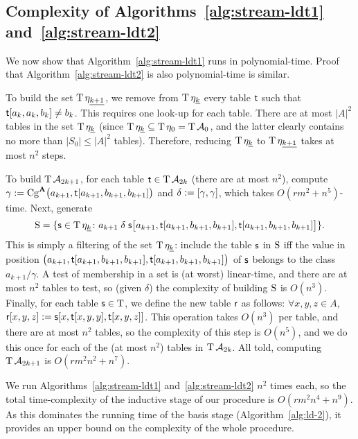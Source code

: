   \subsection{Complexity of Algorithms~\ref{alg:stream-ldt1} and~\ref{alg:stream-ldt2}}
  We now show that Algorithm~\ref{alg:stream-ldt1} runs in polynomial-time.
  Proof that Algorithm~\ref{alg:stream-ldt2} is also polynomial-time is similar.

  To build the set $\operatorname{T} \eta_{\underline{k+1}}$, we remove
  from $\operatorname{T} \eta_{\underline{k}}$ every table $\mathsf{t}$ such that $\mathsf{t}[a_k,a_k,b_k]\neq b_k$.
  This requires one look-up for each table.  There are
  at most $|A|^2$ tables in the set $\operatorname{T} \eta_{\underline{k}}$
  (since $\operatorname{T} \eta_{\underline{k}} \subseteq \operatorname{T} \eta_0 = \operatorname{T} \mathcal{A}_0$, and
  the latter clearly contains no more than $|S_0| \leq |A|^2$ tables).
  Therefore, reducing $\operatorname{T} \eta_{\underline{k}}$ to $\operatorname{T} \eta_{\underline{k+1}}$ takes at most $n^2$ steps.

  To build $\operatorname{T} \mathcal{A}_{2k+1}$,
  for each table $\mathsf{t} \in \operatorname{T} \mathcal{A}_{2k}$ (there are at most $n^2$),
  compute $\gamma := \operatorname{Cg}^{\mathbf{A}}\bigl(a_{k+1}, \mathsf{t}[a_{k+1}, b_{k+1}, b_{k+1}]\bigr)$ and
  $\delta := [\gamma, \gamma]$, which takes
  $O(rm^2 + n^5)$-time.  Next, generate
  \[
    \operatorname{S} = \{\mathsf{s} \in \operatorname{T} \eta_{\underline{k}} \colon  a_{k+1} \mathrel{\delta}
    \mathsf{s} \bigl[a_{k+1},  \mathsf{t}[a_{k+1}, b_{k+1}, b_{k+1}],  \mathsf{t}[a_{k+1}, b_{k+1}, b_{k+1}]\bigr]\}.
  \]
  This is simply a filtering of the set $\operatorname{T} \eta_{\underline{k}}$:
  include the table $\mathsf{s}$ in $\operatorname{S}$ iff the value in position
  $\bigl(a_{k+1},  \mathsf{t}[a_{k+1}, b_{k+1}, b_{k+1}],  \mathsf{t}[a_{k+1}, b_{k+1}, b_{k+1}]\bigr)$
  of $\mathsf{s}$ belongs to the class $a_{k+1}/\gamma$.
  A test of membership in a set is (at worst) linear-time, and there are at
  most $n^2$ tables to test, so (given $\delta$) the complexity of building
  $\operatorname{S}$ is $O(n^3)$.
  Finally, for each table $\mathsf{s} \in \operatorname{T}$, we define the new table
  $\mathsf{r}$ as follows:
  $\forall x, y, z \in A$, $\mathsf{r}[x,y,z] :=  \mathsf{s}[x, \mathsf{t}[x,y,y], \mathsf{t}[x,y,z]]$.
  This operation takes $O(n^3)$ per table, and there are at most $n^2$ tables,
  so the complexity of this step is $O(n^5)$, and we do this once for each of the
  (at most $n^2$) tables in $\operatorname{T} \mathcal{A}_{2k}$.  All told, computing
  $\operatorname{T} \mathcal{A}_{2k+1}$ is $O(rm^2n^2 + n^7)$.

  We run Algorithms~\ref{alg:stream-ldt1} and~\ref{alg:stream-ldt2} $n^2$ times each,
  so the total time-complexity of the inductive stage of our procedure is
  $O(rm^2n^4 + n^9)$. As this dominates the running time of the basis
  stage (Algorithm~\ref{alg:ld-2}), it provides an upper bound on the
  complexity of the whole procedure.










